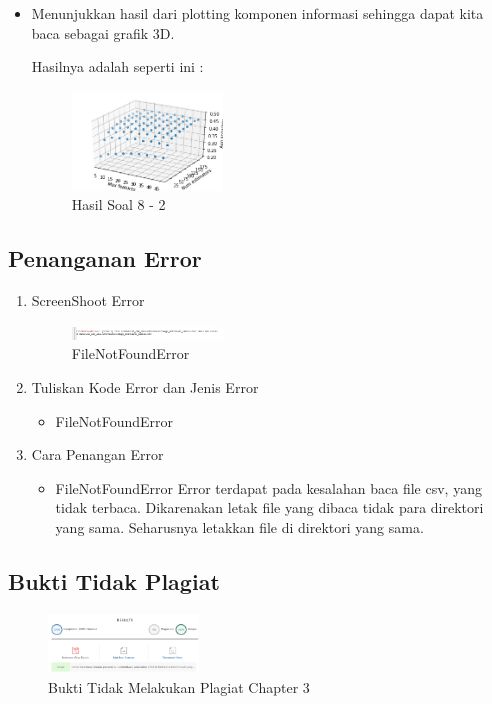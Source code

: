 \begin{enumerate}
\begin{itemize}
	\item Menunjukkan hasil dari plotting komponen informasi sehingga dapat kita baca sebagai grafik 3D.
	
	Hasilnya adalah seperti ini :

	\begin{figure}[H]
	\centering
		\includegraphics[width=4cm]{figures/1174086/3/soal83.PNG}
		\caption{Hasil Soal 8 - 2}
	\end{figure}
\end{itemize}
\end{enumerate}

\subsection{Penanganan Error}
\begin{enumerate}
	\item ScreenShoot Error
	\begin{figure}[H]
		\includegraphics[width=4cm]{figures/1174086/error/1.PNG}
		\centering
		\caption{FileNotFoundError}
	\end{figure}
	\item Tuliskan Kode Error dan Jenis Error
	\begin{itemize}
		\item FileNotFoundError
	\end{itemize}
	\item Cara Penangan Error
	\begin{itemize}
		\item FileNotFoundError
		\hfill\break
		Error terdapat pada kesalahan baca file csv, yang tidak terbaca. Dikarenakan letak file yang dibaca tidak para direktori yang sama. Seharusnya letakkan file di direktori yang sama. 
	\end{itemize}
\end{enumerate}
\subsection{Bukti Tidak Plagiat}
\begin{figure}[H]
\centering
	\includegraphics[width=4cm]{figures/1174086/bukti/1.PNG}
	
	\caption{Bukti Tidak Melakukan Plagiat Chapter 3}
\end{figure}
	

